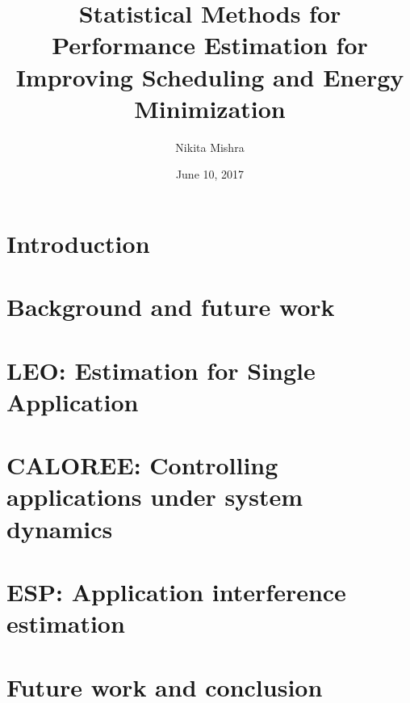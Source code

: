 \documentclass{ucetd}
\title{Statistical Methods for Performance Estimation for Improving Scheduling and Energy Minimization}
\author{Nikita Mishra}
\date{June 10, 2017}
\begin{document}
\maketitle

\makecopyright
\makededication
\makeepigraph
\tableofcontents
\listoffigures
\listoftables
\graphicspath{{figures/}} %

\acknowledgments


\mainmatter

\chapter{Introduction}

%
%
%

\chapter{Background and future work}

%
%
%

\chapter{LEO: Estimation for Single Application}
%





%

\chapter{CALOREE: Controlling applications under system dynamics}
%



%

\chapter{ESP: Application interference estimation}
%
%
%



%

\chapter{Future work and conclusion}


\newpage
%


%
%
\end{document}
